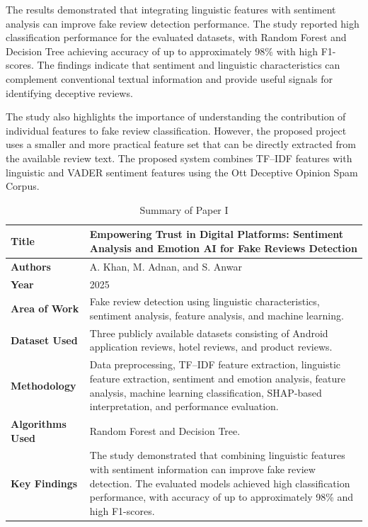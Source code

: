 \documentclass[12pt,a4paper]{report}
\begin{document}
The results demonstrated that integrating linguistic features with sentiment analysis can improve fake review detection performance. The study reported high classification performance for the evaluated datasets, with Random Forest and Decision Tree achieving accuracy of up to approximately 98\% with high F1-scores. The findings indicate that sentiment and linguistic characteristics can complement conventional textual information and provide useful signals for identifying deceptive reviews.

The study also highlights the importance of understanding the contribution of individual features to fake review classification. However, the proposed project uses a smaller and more practical feature set that can be directly extracted from the available review text. The proposed system combines TF--IDF features with linguistic and VADER sentiment features using the Ott Deceptive Opinion Spam Corpus.

\begin{table}[H]
\centering
\small
\renewcommand{\arraystretch}{1.3}

\begin{tabularx}{0.95\textwidth}{|>{\raggedright\arraybackslash}p{}|X|}
\hline
\textbf{Title} &
Empowering Trust in Digital Platforms: Sentiment Analysis and Emotion AI for Fake Reviews Detection \\
\hline

\textbf{Authors} &
A. Khan, M. Adnan, and S. Anwar \\
\hline

\textbf{Year} &
2025 \\
\hline

\textbf{Area of Work} &
Fake review detection using linguistic characteristics, sentiment analysis, feature analysis, and machine learning. \\
\hline

\textbf{Dataset Used} &
Three publicly available datasets consisting of Android application reviews, hotel reviews, and product reviews. \\
\hline

\textbf{Methodology} &
Data preprocessing, TF--IDF feature extraction, linguistic feature extraction, sentiment and emotion analysis, feature analysis, machine learning classification, SHAP-based interpretation, and performance evaluation. \\
\hline

\textbf{Algorithms Used} &
Random Forest and Decision Tree. \\
\hline

\textbf{Key Findings} &
The study demonstrated that combining linguistic features with sentiment information can improve fake review detection. The evaluated models achieved high classification performance, with accuracy of up to approximately 98\% and high F1-scores. \\
\hline

\end{tabularx}

\caption{Summary of Paper I}
\label{tab:paper1}
\end{table}
\end{document}
